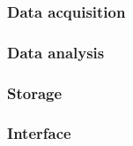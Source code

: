
\subsubsection{Data acquisition}
\subsubsection{Data analysis}
\subsubsection{Storage}
\subsubsection{Interface}
